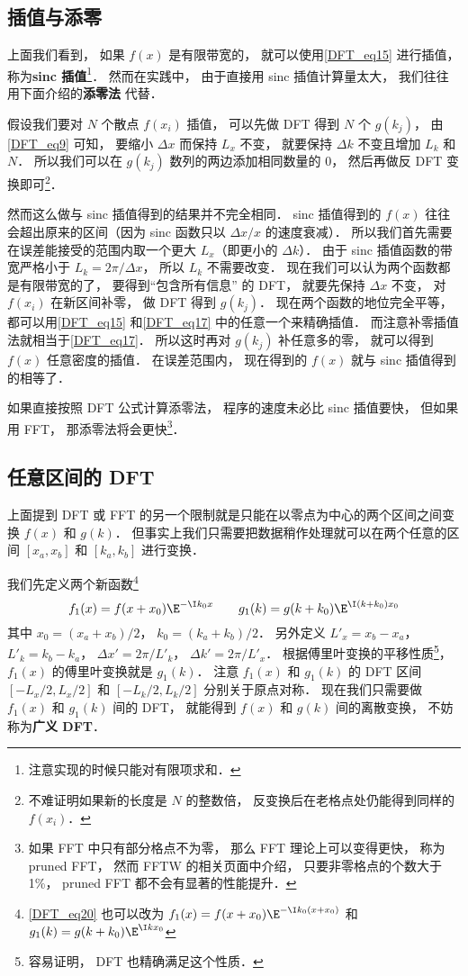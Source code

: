 \subsection{插值与添零}

上面我们看到， 如果 $f(x)$ 是有限带宽的， 就可以使用\autoref{DFT_eq15} 进行插值， 称为\textbf{sinc 插值}\footnote{注意实现的时候只能对有限项求和．}． 然而在实践中， 由于直接用 sinc 插值计算量太大， 我们往往用下面介绍的\textbf{添零法} 代替．

假设我们要对 $N$ 个散点 $f(x_i)$ 插值， 可以先做 DFT 得到 $N$ 个 $g(k_j)$， 由\autoref{DFT_eq9} 可知， 要缩小 $\Delta x$ 而保持 $L_x$ 不变， 就要保持 $\Delta k$ 不变且增加 $L_k$ 和 $N$． 所以我们可以在 $g(k_j)$ 数列的两边添加相同数量的 0， 然后再做反 DFT 变换即可\footnote{不难证明如果新的长度是 $N$ 的整数倍， 反变换后在老格点处仍能得到同样的 $f(x_i)$．}．

然而这么做与 sinc 插值得到的结果并不完全相同． sinc 插值得到的 $f(x)$ 往往会超出原来的区间（因为 sinc 函数只以 $\Delta x/x$ 的速度衰减）． 所以我们首先需要在误差能接受的范围内取一个更大 $L_x$（即更小的 $\Delta k$）． 由于 sinc 插值函数的带宽严格小于 $L_k = 2\pi/\Delta x$， 所以 $L_k$ 不需要改变． 现在我们可以认为两个函数都是有限带宽的了， 要得到“包含所有信息” 的 DFT， 就要先保持 $\Delta x$ 不变， 对 $f(x_i)$ 在新区间补零， 做 DFT 得到 $g(k_j)$． 现在两个函数的地位完全平等， 都可以用\autoref{DFT_eq15} 和\autoref{DFT_eq17} 中的任意一个来精确插值． 而注意补零插值法就相当于\autoref{DFT_eq17}． 所以这时再对 $g(k_j)$ 补任意多的零， 就可以得到 $f(x)$ 任意密度的插值． 在误差范围内， 现在得到的 $f(x)$ 就与 sinc 插值得到的相等了．

如果直接按照 DFT 公式计算添零法， 程序的速度未必比 sinc 插值要快， 但如果用 FFT， 那添零法将会更快\footnote{如果 FFT 中只有部分格点不为零， 那么 FFT 理论上可以变得更快， 称为 pruned FFT， 然而 FFTW 的相关页面中介绍， 只要非零格点的个数大于 1\%， pruned FFT 都不会有显著的性能提升．}．

\subsection{任意区间的 DFT}
上面提到 DFT 或 FFT 的另一个限制就是只能在以零点为中心的两个区间之间变换 $f(x)$ 和 $g(k)$． 但事实上我们只需要把数据稍作处理就可以在两个任意的区间 $[x_a, x_b]$ 和 $[k_a, k_b]$ 进行变换．

我们先定义两个新函数\footnote{\autoref{DFT_eq20} 也可以改为 $f_1(x) = f(x + x_0)\E^{-\I k_0 (x+x_0)}$ 和 $g_1(k) = g(k + k_0)\E^{\I k x_0}$}
\begin{equation}\label{DFT_eq20}
f_1(x) = f(x + x_0)\E^{-\I k_0 x} \qquad g_1(k) = g(k + k_0)\E^{\I (k+k_0) x_0}
\end{equation}
其中 $x_0 = (x_a + x_b)/2$，  $k_0 = (k_a + k_b)/2$． 另外定义 $L'_x = x_b - x_a$， $L'_k = k_b-k_a$， $\Delta x' = 2\pi/L'_k$， $\Delta k' = 2\pi/L'_x$． 根据傅里叶变换的平移性质\footnote{容易证明， DFT 也精确满足这个性质．}，%
$f_1(x)$ 的傅里叶变换就是 $g_1(k)$． 注意 $f_1(x)$ 和 $g_1(k)$ 的 DFT 区间 $[-L_x/2, L_x/2]$ 和 $[-L_k/2, L_k/2]$ 分别关于原点对称． 现在我们只需要做 $f_1(x)$ 和 $g_1(k)$ 间的  DFT， 就能得到 $f(x)$ 和 $g(k)$ 间的离散变换， 不妨称为\textbf{广义 DFT}．

